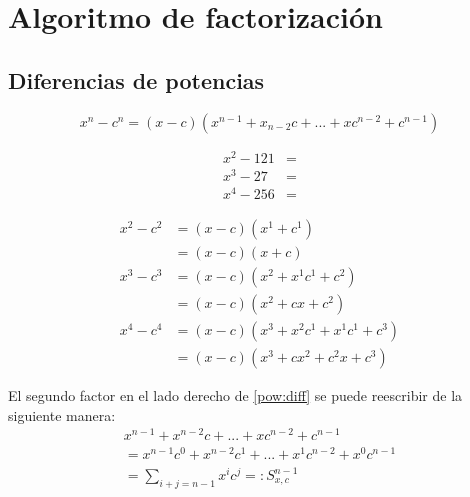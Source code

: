 
\section{Algoritmo de factorización}
\subsection{Diferencias de potencias}


	\begin{proposicion}
		\[
			\label{pow:diff}
			\tag{dP}
			x^{n}-c^{n}=(x-c)\left( x^{n-1}+x_{n-2}c+...+xc^{n-2}+c^{n-1} \right)
		\]
		
	\end{proposicion}
	



	\begin{problema}
		\begin{align*}
			x^{2}-121&= \\
			x^{3}-27&= \\
			x^{4}-256&=
		\end{align*}		
	\end{problema}
	



	\begin{problema} 
		\begin{align*} 
			x^{2}-c^{2}
			&=(x-c)\left( x^{1}+c^{1} \right) \\
			&=(x-c)(x+c)  \\ 
			x^{3}-c^{3}
			&=(x-c)\left( x^{2}+x^{1}c^{1}+c^{2} \right)  \\
			& = (x-c)\left( x^{2}+cx+c^{2} \right) \\
			x^{4}-c^{4}
			&=(x-c)\left( x^{3}+x^{2}c^{1}+x^{1}c^{1}+c^{3} \right) \\
			&=(x-c)\left( x^{3}+cx^{2}+c^{2}x+c^{3} \right)
		\end{align*}
		
	\end{problema}
	



	El segundo factor en el lado derecho de \eqref{pow:diff} se puede reescribir de la siguiente manera:  
	\begin{align*}
		\nonumber
		x^{n-1}+x^{n-2}c+...+xc^{n-2}+c^{n-1} \\
		\nonumber 
		=x^{n-1}c^{0}+x^{n-2}c^{1}+...+x^{1}c^{n-2}+x^{0}c^{n-1} \\
		\label{sym:sum}
		\tag{pS}
		=\sum_{i+j=n-1}x^{i}c^{j}
		=:S^{n-1}_{x,c}
	\end{align*}
	
